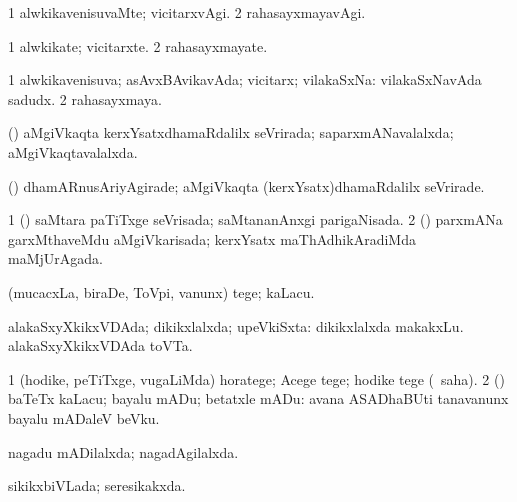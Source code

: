 \bentry
{} 
\gl{\kirxvi}
\expl{}
\bmng
\bnum
\num{1} alwkikavenisuvaMte; vicitarxvAgi. 
\num{2} rahasayxmayavAgi. 
\enum
\emng
\eentry

\bentry
{} 
\gl{\nA}
\expl{}
\bmng
\bnum
\num{1} alwkikate; vicitarxte. 
\num{2} rahasayxmayate. 
\enum
\emng
\eentry

\bentry
{} 
\gl{\gu}
\bmng
\bnum
\num{1} alwkikavenisuva; asAvxBAvikavAda; vicitarx; vilakaSxNa:  vilakaSxNavAda sadudx. 
\num{2} rahasayxmaya. 
\enum
\emng
\eentry

\bentry
{} 
\gl{\gu}
\expl{}
\bmng
(\kerxY) aMgiVkaqta kerxYsatxdhamaRdalilx seVrirada; saparxmANavalalxda; aMgiVkaqtavalalxda. 
\emng
\eentry

\bentry
{} 
\gl{\kirxvi}
\expl{}
\bmng
(\kerxY) dhamARnusAriyAgirade; aMgiVkaqta (kerxYsatx)dhamaRdalilx seVrirade. 
\emng
\eentry

\bentry
{} 
\gl{\gu}
\expl{}
\bmng
\bnum
\num{1} (\kerxY) saMtara paTiTxge seVrisada; saMtananAnxgi parigaNisada. 
\num{2} (\kerxY) parxmANa garxMthaveMdu aMgiVkarisada; kerxYsatx maThAdhikAradiMda maMjUrAgada. 
\enum
\emng
\eentry

\bentry
{} 
\gl{\sakirx}
\bmng
(mucacxLa, biraDe, ToVpi, \mo vanunx) tege; kaLacu. 
\emng
\eentry

\bentry
{} 
\gl{\gu}
\expl{}
\bmng
alakaSxyXkikxVDAda; dikikxlalxda; upeVkiSxta:  dikikxlalxda makakxLu.  alakaSxyXkikxVDAda toVTa. 
\emng
\eentry

\bentry
{} 
\gl{\sakirx}
\expl{}
\bmng
\bnum
\num{1} (hodike, peTiTxge, \mo vugaLiMda) horatege; Acege tege; hodike tege (\akirx\ saha). 
\num{2} (\pArxparx) baTeTx kaLacu; bayalu mADu; betatxle mADu:  avana ASADhaBUti tanavanunx bayalu mADaleV beVku. 
\enum
\emng
\eentry

\bentry
{} 
\gl{\gu}
\expl{}
\bmng
nagadu mADilalxda; nagadAgilalxda. 
\emng
\eentry

\bentry
{} 
\gl{\gu}
\bmng
sikikxbiVLada; seresikakxda. 
\emng
\eentry

